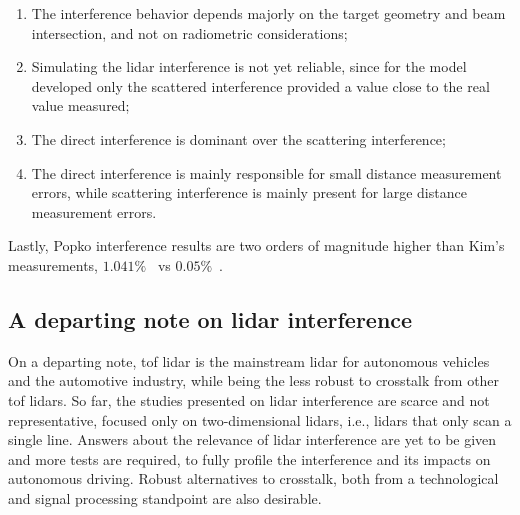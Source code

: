 \begin{enumerate}
	\item The interference behavior depends majorly on the target geometry and beam intersection, and not on radiometric considerations;
	\item Simulating the \ac{lidar} interference is not yet reliable, since for the model developed only the scattered interference provided a value close to the real value measured;
	\item The direct interference is dominant over the scattering interference;
	\item The direct interference is mainly responsible for small distance measurement errors, while scattering interference is mainly present for large distance measurement errors.
\end{enumerate}

Lastly, Popko \etal interference results are two orders of magnitude higher than Kim's \etal measurements, $1.041 \%$~\cite{Popko2019b} vs $0.05\%$~\cite{Kim2015a}.

\subsection{A departing note on \ac{lidar} interference}
On a departing note, \ac{tof} \ac{lidar} is the mainstream \ac{lidar} for autonomous vehicles and the automotive industry, while being the less robust to crosstalk from other \ac{tof} \acp{lidar}. So far, the studies presented on \ac{lidar} interference are scarce and not representative, focused only on two-dimensional \acp{lidar}, i.e., \acp{lidar} that only scan a single line. Answers about the relevance of \ac{lidar} interference are yet to be given and more tests are required, to fully profile the interference and its impacts on autonomous driving. Robust alternatives to crosstalk, both from a technological and signal processing standpoint are also desirable.
